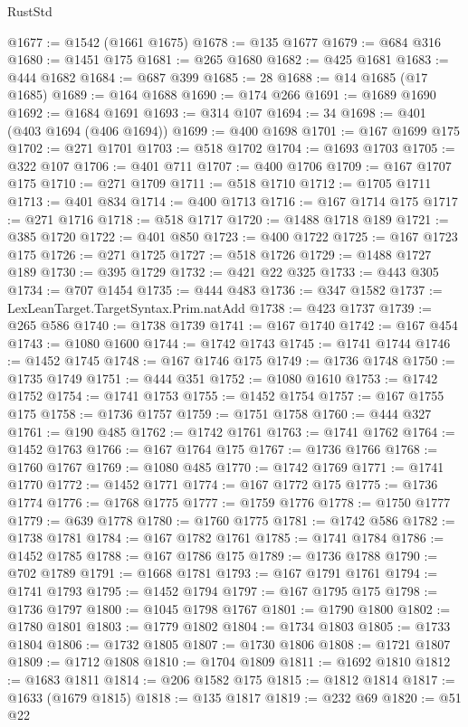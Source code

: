 \begin{lexlean}{RustStd}
\begin{coremodule}
{\begin{coremodule}
{{{{{{{{{{{{{{{{{{{{{{{{{{{{{{{{{{@1677 := @1542 (@1661 @1675)
@1678 := @135 @1677
@1679 := @684 @316
@1680 := @1451 @175
@1681 := @265 @1680
@1682 := @425 @1681
@1683 := @444 @1682
@1684 := @687 @399
@1685 := 28
@1688 := @14 @1685 (@17 @1685)
@1689 := @164 @1688
@1690 := @174 @266
@1691 := @1689 @1690
@1692 := @1684 @1691
@1693 := @314 @107
@1694 := 34
@1698 := @401 (@403 @1694 (@406 @1694))
@1699 := @400 @1698
@1701 := @167 @1699 @175
@1702 := @271 @1701
@1703 := @518 @1702
@1704 := @1693 @1703
@1705 := @322 @107
@1706 := @401 @711
@1707 := @400 @1706
@1709 := @167 @1707 @175
@1710 := @271 @1709
@1711 := @518 @1710
@1712 := @1705 @1711
@1713 := @401 @834
@1714 := @400 @1713
@1716 := @167 @1714 @175
@1717 := @271 @1716
@1718 := @518 @1717
@1720 := @1488 @1718 @189
@1721 := @385 @1720
@1722 := @401 @850
@1723 := @400 @1722
@1725 := @167 @1723 @175
@1726 := @271 @1725
@1727 := @518 @1726
@1729 := @1488 @1727 @189
@1730 := @395 @1729
@1732 := @421 @22 @325
@1733 := @443 @305
@1734 := @707 @1454
@1735 := @444 @483
@1736 := @347 @1582
@1737 := LexLeanTarget.TargetSyntax.Prim.natAdd
@1738 := @423 @1737
@1739 := @265 @586
@1740 := @1738 @1739
@1741 := @167 @1740
@1742 := @167 @454
@1743 := @1080 @1600
@1744 := @1742 @1743
@1745 := @1741 @1744
@1746 := @1452 @1745
@1748 := @167 @1746 @175
@1749 := @1736 @1748
@1750 := @1735 @1749
@1751 := @444 @351
@1752 := @1080 @1610
@1753 := @1742 @1752
@1754 := @1741 @1753
@1755 := @1452 @1754
@1757 := @167 @1755 @175
@1758 := @1736 @1757
@1759 := @1751 @1758
@1760 := @444 @327
@1761 := @190 @485
@1762 := @1742 @1761
@1763 := @1741 @1762
@1764 := @1452 @1763
@1766 := @167 @1764 @175
@1767 := @1736 @1766
@1768 := @1760 @1767
@1769 := @1080 @485
@1770 := @1742 @1769
@1771 := @1741 @1770
@1772 := @1452 @1771
@1774 := @167 @1772 @175
@1775 := @1736 @1774
@1776 := @1768 @1775
@1777 := @1759 @1776
@1778 := @1750 @1777
@1779 := @639 @1778
@1780 := @1760 @1775
@1781 := @1742 @586
@1782 := @1738 @1781
@1784 := @167 @1782 @1761
@1785 := @1741 @1784
@1786 := @1452 @1785
@1788 := @167 @1786 @175
@1789 := @1736 @1788
@1790 := @702 @1789
@1791 := @1668 @1781
@1793 := @167 @1791 @1761
@1794 := @1741 @1793
@1795 := @1452 @1794
@1797 := @167 @1795 @175
@1798 := @1736 @1797
@1800 := @1045 @1798 @1767
@1801 := @1790 @1800
@1802 := @1780 @1801
@1803 := @1779 @1802
@1804 := @1734 @1803
@1805 := @1733 @1804
@1806 := @1732 @1805
@1807 := @1730 @1806
@1808 := @1721 @1807
@1809 := @1712 @1808
@1810 := @1704 @1809
@1811 := @1692 @1810
@1812 := @1683 @1811
@1814 := @206 @1582 @175
@1815 := @1812 @1814
@1817 := @1633 (@1679 @1815)
@1818 := @135 @1817
@1819 := @232 @69
@1820 := @51 @22
}}}}}}}}}}}}}}}}}}}}}}}}}}}}}}}}}}
\end{coremodule}}
\end{coremodule}
\end{lexlean}
